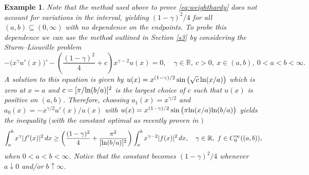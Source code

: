 \documentclass[reqno,10pt,centertags]{amsart}
\newcommand{\bbR}{{\mathbb{R}}}
\newcommand{\g}{\gamma}
\renewcommand{\ln}{\text{\rm ln}}
\newcounter{count}
\numberwithin{equation}{section}
\newtheorem{example}[theorem]{Example}
\theoremstyle{remark}
\begin{document}
\begin{example}
Note that the method used above to prove \eqref{eq:weighthardy} does not account for variations in the interval, yielding $(1-\g)^2/4$ for all $(a,b)\subseteq(0,\infty)$ with no dependence on the endpoints. To probe this dependence we can use the method outlined in Section \ref{s3} by considering the Sturm--Liouville problem
\begin{equation}
-\big(x^\g u'(x)\big)'-\left(\frac{(1-\g)^2}{4}+c \right)x^{\g-2} u(x)=0,\quad \g\in\bbR,\ c>0,\ x\in(a,b),\ 0<a<b<\infty.
\end{equation}
A solution to this equation is given by $u(x)=x^{(1-\g)/2} \sin\big(\sqrt{c}\, \ln(x/a)\big)$ which is zero at $x=a$ and $c=[\pi/\ln(b/a)]^2$ is the largest choice of $c$ such that $u(x)$ is positive on $(a,b)$. Therefore, choosing $a_1(x)=x^{\g/2}$ and $a_0(x)=-x^{\g/2}u'(x)/u(x)$ with $u(x)=x^{(1-\g)/2} \sin\big(\pi \ln(x/a)\ln(b/a)\big)$ yields the inequality $($with the constant optimal as recently proven in \cite{GP25}$)$
\begin{equation}
\int_a^b x^\gamma |f'(x)|^2\, dx\geq \left(\frac{(1-\gamma)^2}{4}+\frac{\pi^2}{[\ln(b/a)]^2}\right)\int_a^b x^{\gamma-2}|f(x)|^2\, dx,\ \ \ \g\in\bbR,\ f\in C^\infty_0((a,b)),
\end{equation}
when $0<a<b<\infty$.
Notice that the constant becomes $(1-\g)^2/4$ whenever $a\downarrow0$ and/or $b\uparrow\infty$.
\end{example}
\end{document}
